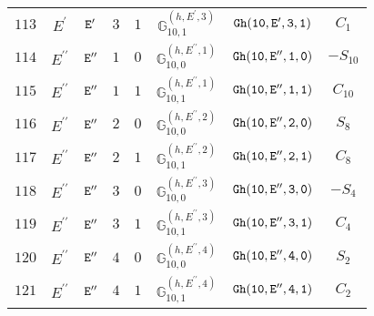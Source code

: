 \documentclass[fleqn,8pt]{jsarticle}
\begin{document}
\begin{table}[ht!]
\begin{center}
\begin{tabular}{cccccccc}
$ 113 $ & $ E^{\prime} $ & $ {\tt E'} $ & $ 3 $ & $ 1 $ & $ \mathbb{G}_{10,1}^{(h,E^{\prime},3)} $ & $ {\tt Gh(10,E',3,1)} $ & $ C_{1} $ \\
$ 114 $ & $ E^{\prime\prime} $ & $ {\tt E''} $ & $ 1 $ & $ 0 $ & $ \mathbb{G}_{10,0}^{(h,E^{\prime\prime},1)} $ & $ {\tt Gh(10,E'',1,0)} $ & $ - S_{10} $ \\
$ 115 $ & $ E^{\prime\prime} $ & $ {\tt E''} $ & $ 1 $ & $ 1 $ & $ \mathbb{G}_{10,1}^{(h,E^{\prime\prime},1)} $ & $ {\tt Gh(10,E'',1,1)} $ & $ C_{10} $ \\
$ 116 $ & $ E^{\prime\prime} $ & $ {\tt E''} $ & $ 2 $ & $ 0 $ & $ \mathbb{G}_{10,0}^{(h,E^{\prime\prime},2)} $ & $ {\tt Gh(10,E'',2,0)} $ & $ S_{8} $ \\
$ 117 $ & $ E^{\prime\prime} $ & $ {\tt E''} $ & $ 2 $ & $ 1 $ & $ \mathbb{G}_{10,1}^{(h,E^{\prime\prime},2)} $ & $ {\tt Gh(10,E'',2,1)} $ & $ C_{8} $ \\
$ 118 $ & $ E^{\prime\prime} $ & $ {\tt E''} $ & $ 3 $ & $ 0 $ & $ \mathbb{G}_{10,0}^{(h,E^{\prime\prime},3)} $ & $ {\tt Gh(10,E'',3,0)} $ & $ - S_{4} $ \\
$ 119 $ & $ E^{\prime\prime} $ & $ {\tt E''} $ & $ 3 $ & $ 1 $ & $ \mathbb{G}_{10,1}^{(h,E^{\prime\prime},3)} $ & $ {\tt Gh(10,E'',3,1)} $ & $ C_{4} $ \\
$ 120 $ & $ E^{\prime\prime} $ & $ {\tt E''} $ & $ 4 $ & $ 0 $ & $ \mathbb{G}_{10,0}^{(h,E^{\prime\prime},4)} $ & $ {\tt Gh(10,E'',4,0)} $ & $ S_{2} $ \\
$ 121 $ & $ E^{\prime\prime} $ & $ {\tt E''} $ & $ 4 $ & $ 1 $ & $ \mathbb{G}_{10,1}^{(h,E^{\prime\prime},4)} $ & $ {\tt Gh(10,E'',4,1)} $ & $ C_{2} $ \\
 \hline \hline
\end{tabular}
\end{center}
\end{table}
\end{document}
